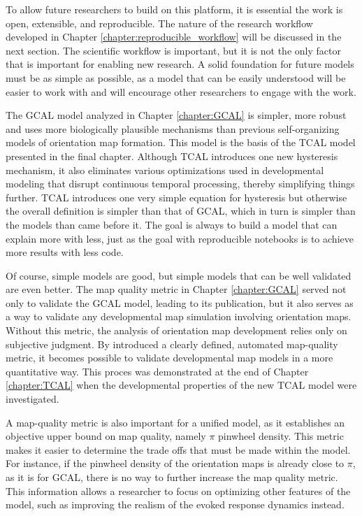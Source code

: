 \documentclass[phd,ianc,twoside]{infthesis}
\begin{document}
To allow future researchers to build on this platform, it is essential
the work is open, extensible, and reproducible. The nature of the
research workflow developed in Chapter
\ref{chapter:reproducible_workflow} will be discussed in the next
section. The scientific workflow is important, but it is not the only
factor that is important for enabling new research. A solid foundation
for future models must be as simple as possible, as a model
that can be easily understood will be easier to work with and will encourage other
researchers to engage with the work.

The GCAL model analyzed in Chapter \ref{chapter:GCAL} is simpler, more
robust and uses more biologically plausible mechanisms than previous
self-organizing models of orientation map formation. This model is the
basis of the TCAL model presented in the final 
chapter. Although TCAL introduces one new hysteresis mechanism, it also
eliminates various optimizations used in developmental modeling that
disrupt continuous temporal processing, thereby simplifying things
further. TCAL introduces one very simple equation for hysteresis but
otherwise the overall definition is simpler than that of GCAL, which in turn is simpler
than the models than came before it. The goal is always to
build a model that can explain more with less, just as the goal with
reproducible notebooks is to achieve more results with less code. 

Of course, simple models are good, but simple models that can be well validated are
even better. The map quality metric in Chapter \ref{chapter:GCAL} served
not only to validate the GCAL model, leading to its publication, but it
also serves as a way to validate any developmental map simulation
involving orientation maps. Without this 
metric, the analysis of orientation map development relies only on subjective
judgment. By introduced a clearly defined, automated map-quality metric,
it becomes possible to validate developmental map models in a more
quantitative way. This proces was demonstrated at the end of Chapter
\ref{chapter:TCAL} when the developmental properties of the new TCAL
model were investigated. 

A map-quality metric is also important for a unified model, as it
establishes an objective upper bound on map quality, namely
$\pi$ pinwheel density. This metric makes it easier to determine the trade offs
that must be made within the model. For instance, if the pinwheel
density of the orientation maps is already close to $\pi$, as it is for
GCAL, there is no way to further increase the map quality metric. This
information allows a researcher to focus on optimizing other features of
the model, such as improving the realism of the evoked response dynamics
instead.
\end{document}
